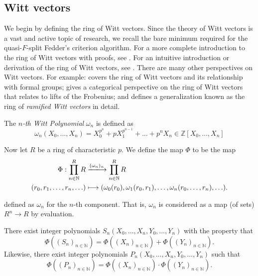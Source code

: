 
\subsection{Witt vectors}

We begin by defining the ring of Witt vectors. 
Since the theory of Witt vectors is a vast and active topic of research,
we recall the bare minimum 
required for the quasi-\(F\)-split Fedder's criterion algorithm.
For a more complete introduction to the ring of Witt vectors with proofs, 
see \cite{rabinoff-2014-witt-vec}.
For an intuitive introduction or derivation of the ring of Witt vectors, see
\cite{kim-2017-witt-vec}.
There are many other perspectives on Witt vectors. 
For example:
\cite[Chapter~17]{hazewinkel-1978-formal-groups} covers the ring of Witt vectors
and its relationship with formal groups; 
\cite{kedlaya-2021-prismatic} gives a categorical perspective on the ring of Witt vectors
that relates to lifts of the Frobenius; and
\cite[Chapter~1]{schneider-2017-galois-rep-phi-gamma} defines a generalization
known as the ring of \textit{ramified Witt vectors} in detail.

\begin{defn}
	The \textit{\(n\)-th Witt Polynomial} \(\omega_{n}\) is defined as
	\[
		\omega_{n}(X_{0}, \ldots, X_{n}) = X_{0}^{p^{n}} + pX_{1}^{p^{n-1}} + \ldots + p^{n}X_{n}
        \in \mathbb{Z}[X_{0}, \ldots, X_{n}]
	\] 
    
\end{defn}

\noindent Now let \(R\) be a ring of characteristic \(p\).
We define the map \(\Phi\) to be the map 
\begin{align*}
    \Phi : \prod_{n \in \mathbb{N}}^{R} R  
    &\xlongrightarrow{(\omega_{n})_{n}} \prod_{n \in \mathbb{N}}^{R} R \\
    (r_{0}, r_{1}, \ldots, r_{n}, \ldots) &\longmapsto 
    (\omega_{0}(r_{0}), \omega_{1}(r_{0}, r_{1}), 
    \ldots, \omega_{n}(r_{0}, \ldots, r_{n}), \ldots)
.\end{align*}

defined as \(\omega_{n}\) for the \(n\)-th component.
That is, \(\omega_{n}\) is considered as a 
map (of sets) \(R^{n} \xrightarrow{} R\) by
evaluation.

\begin{lem}
	There exist integer polynomials 
	\(S_n(X_{0}, \ldots, X_{n}, Y_{0}, \ldots, Y_{n})\) 
	with the property that 
	\[
		\Phi((S_{n})_{n \in \mathbb{N}}) =
		\Phi((X_{n})_{n \in \mathbb{N}}) 
		+ \Phi((Y_{n})_{n \in \mathbb{N}})
	.\] 
	Likewise, there exist integer polynomials 
	\(P_{n}(X_{0}, \ldots, X_{n}, Y_{0}, \ldots, Y_{n})\)
	such that
	\[
		\Phi((P_{n})_{n \in \mathbb{N}}) =
		\Phi((X_{n})_{n \in \mathbb{N}}) 
		\cdot \Phi((Y_{n})_{n \in \mathbb{N}})
	.\] 
\end{lem}

